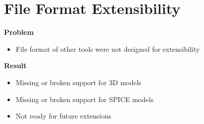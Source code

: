 \section{File Format Extensibility}

\begin{frame}{\secname}
  \textbf{Problem}
  \begin{itemize}
    \item File format of other tools were not designed for extensibility
  \end{itemize}
  
  \pause
  
  \textbf{Result}
  \begin{itemize}
    \item Missing or broken support for 3D models
    \item Missing or broken support for SPICE models
    \item Not ready for future extensions
  \end{itemize}
\end{frame}


